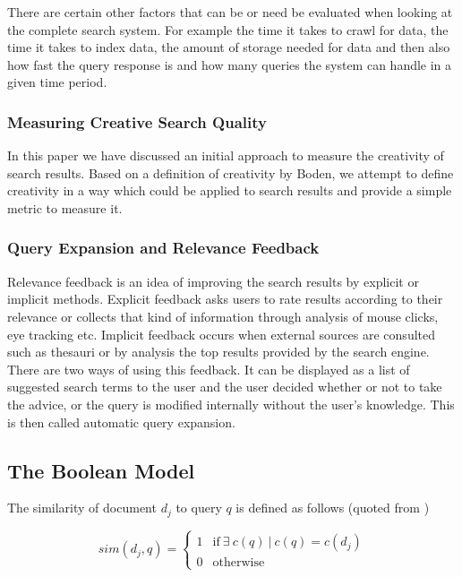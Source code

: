 There are certain other factors that can be or need be evaluated when looking at the complete search system. For example the time it takes to crawl for data, the time it takes to index data, the amount of storage needed for data and then also how fast the query response is and how many queries the system can handle in a given time period.

\subsubsection{Measuring Creative Search Quality}

In this paper \citep{Sawle2011} we have discussed an initial approach to measure the creativity of search results. Based on a definition of creativity by Boden, we attempt to define creativity in a way which could be applied to search results and provide a simple metric to measure it.

\subsubsection{Query Expansion and Relevance Feedback}

Relevance feedback is an idea of improving the search results by explicit or implicit methods. Explicit feedback asks users to rate results according to their relevance or collects that kind of information through analysis of mouse clicks, eye tracking etc. Implicit feedback occurs when external sources are consulted such as thesauri or by analysis the top results provided by the search engine. There are two ways of using this feedback. It can be displayed as a list of suggested search terms to the user and the user decided whether or not to take the advice, or the query is modified internally without the user's knowledge. This is then called automatic query expansion.

\subsection*{The Boolean Model}

The similarity of document $d_j$ to query $q$ is defined as follows (quoted from \citep[p.65]{Baeza-Yates2011})

\begin{equation}
  sim(d_j,q) =
  \begin{cases}
  1 & \text{if} \ \exists \ c(q) \ | \ c(q) = c(d_j)\\
  0 & \text{otherwise}
  \end{cases}
\end{equation}

